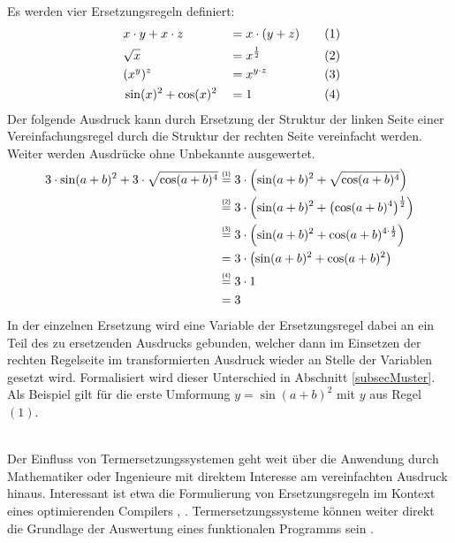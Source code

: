 \begin{beispiel}~\\
Es werden vier Ersetzungsregeln definiert:
\begin{alignat*}{4}
    ~& x \cdot y + x \cdot z & &= x \cdot (y + z) &~~~& (1) \\
    ~& \sqrt{x}              & &= x^{\frac 1 2}   &~~~& (2) \\
    ~& (x^y)^z         & &= x^{y \cdot z}   &~~~& (3) \\
    ~& \sin(x)^2 + \cos(x)^2 & &= 1               &~~~& (4)
\end{alignat*}
Der folgende Ausdruck kann durch Ersetzung der Struktur der linken Seite einer Vereinfachungsregel durch die Struktur der rechten Seite vereinfacht werden. Weiter werden Ausdrücke ohne Unbekannte ausgewertet.
\begin{equation*}
    \begin{split}
	3 \cdot \sin(a + b)^2 + 3 \cdot \sqrt{\cos(a + b)^4}
	&\stapel = {(1)} 3 \cdot \paren*{\sin(a + b)^2 + \sqrt{\cos(a + b)^4}} \\
	&\stapel = {(2)} 3 \cdot \paren*{\sin(a + b)^2 + \paren*{{\cos(a + b)^4}}^{\frac 1 2}}\\
	&\stapel = {(3)} 3 \cdot \paren*{\sin(a + b)^2 + {\cos(a + b)^{4 \cdot \frac 1 2}}}\\
	& =              3 \cdot \paren*{\sin(a + b)^2 + {\cos(a + b)^2}}\\
	&\stapel = {(4)} 3 \cdot 1\\
    & = 3
    \end{split}
\end{equation*}
In der einzelnen Ersetzung wird eine Variable der Ersetzungsregel dabei an ein Teil des zu ersetzenden Ausdrucks gebunden, welcher dann im Einsetzen der rechten Regelseite im transformierten Ausdruck wieder an Stelle der Variablen gesetzt wird.
 Formalisiert wird dieser Unterschied in Abschnitt \ref{subsecMuster}. Als Beispiel gilt für die erste Umformung $y = \sin(a + b)^2$ mit $y$ aus Regel $(1)$.
\end{beispiel}

~\\
Der Einfluss von Termersetzungssystemen geht weit über die Anwendung durch Mathematiker oder Ingenieure mit direktem Interesse am vereinfachten Ausdruck hinaus. Interessant ist etwa die Formulierung von Ersetzungsregeln im Kontext eines optimierenden Compilers \cite{HaskellCustomRewriteRules}, \cite{HaskellCoreOptimizer}. Termersetzungssysteme können weiter direkt die Grundlage der Auswertung eines funktionalen Programms sein \cite{Jones1987JanRewritingMiranda}.


